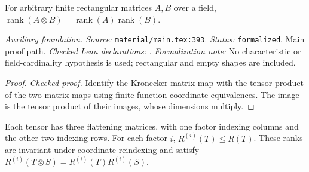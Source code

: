 \renewcommand{\thetheorem}{A35}
\begin{lemma}
\label{aux:matrix-rank-kronecker}
\leanok
For arbitrary finite rectangular matrices $A,B$ over a field, $\operatorname{rank}(A\otimes B)=\operatorname{rank}(A)\operatorname{rank}(B)$.
\end{lemma}

\noindent\textit{Auxiliary foundation. Source:} \texttt{material/main.tex:393}.
\textit{Status:} \texttt{formalized}. Main proof path.
\textit{Checked Lean declarations:} .
\textit{Formalization note:} No characteristic or field-cardinality hypothesis is used; rectangular and empty shapes are included.

\begin{proof}
\leanok
\textit{Checked proof.} Identify the Kronecker matrix map with the tensor product of the two matrix maps using finite-function coordinate equivalences. The image is the tensor product of their images, whose dimensions multiply.
\end{proof}

\renewcommand{\thetheorem}{A36}
\begin{lemma}
\label{aux:flattening-operations}
\leanok
Each tensor has three flattening matrices, with one factor indexing columns and the other two indexing rows. For each factor $i$, $R^{(i)}(T)\le R(T)$. These ranks are invariant under coordinate reindexing and satisfy $R^{(i)}(T\otimes S)=R^{(i)}(T)R^{(i)}(S)$.
\end{lemma}

